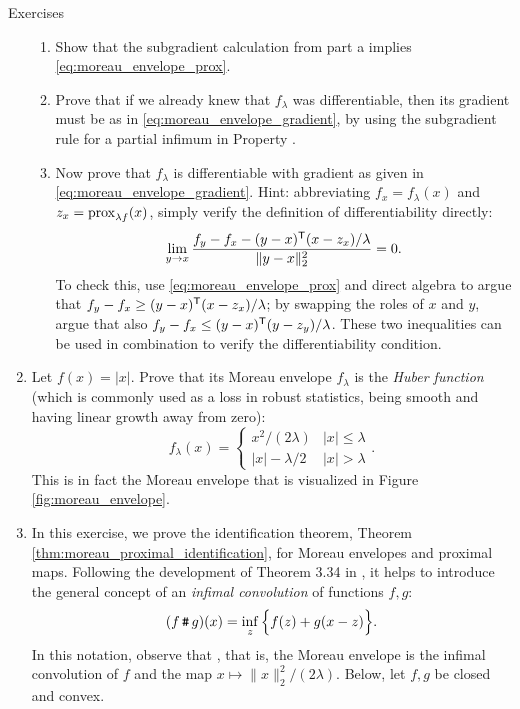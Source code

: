\begin{xcb}{Exercises}
\begin{enumerate}[label=\thechapter.\arabic*]
\begin{enumerate}[label=\alph*.]
\item Show that the subgradient calculation from part a implies
  \eqref{eq:moreau_envelope_prox}. 

\item Prove that if we already knew that $f_\lambda$ was differentiable, then
  its gradient must be as in \eqref{eq:moreau_envelope_gradient}, by using the
  subgradient rule for a partial infimum in Property
  .   

\item Now prove that $f_\lambda$ is differentiable with gradient as given in
  \eqref{eq:moreau_envelope_gradient}. Hint: abbreviating $f_x = f_\lambda(x)$
  and $z_x = \operatorname{prox}_{\lambda f}(x)$, simply verify the definition of
  differentiability directly: 
  \[
  \lim_{y \to x} \frac{f_y - f_x - (y - x)^{\mathsf{T}} (x - z_x) / \lambda}{\|y-x\|_2^2} 
  = 0.
  \]
  To check this, use \eqref{eq:moreau_envelope_prox} and direct algebra to argue 
  that $f_y - f_x \geq (y - x)^{\mathsf{T}} (x - z_x) / \lambda$; by swapping the roles of
  $x$ and $y$, argue that also $f_y - f_x \leq (y - x)^{\mathsf{T}} (y - z_y) / \lambda$. 
  These two inequalities can be used in combination to verify the
  differentiability condition.     
\end{enumerate}

\item Let $f(x) = |x|$. Prove that its Moreau envelope $f_\lambda$ is the 
  \emph{Huber function} (which is commonly used as a loss in robust statistics,
  being smooth and having linear growth away from zero): 
  \[
  f_\lambda(x) = 
  \begin{cases}
  x^2/ (2\lambda) & |x| \leq \lambda \\
  |x| - \lambda/2 & |x| > \lambda
  \end{cases}.
  \]
  This is in fact the Moreau envelope that is visualized in Figure
  \ref{fig:moreau_envelope}.  

\item \label{ex:moreau_proximal_identification}
  In this exercise, we prove the identification theorem, Theorem
  \ref{thm:moreau_proximal_identification}, for Moreau envelopes and proximal
  maps. Following the development of Theorem 3.34 in
  \cite{rockafellar2009variational}, it helps to introduce the general concept 
  of an \emph{infimal convolution} of functions $f,g$: 
  \[
  (f \operatorname{\texttt{\#}} g)(x) = \inf_z \Big\{ f(z) + g(x-z) \Big\}.
  \]
  In this notation, observe that , that is, the Moreau envelope is the infimal convolution of $f$
  and the map $x \mapsto \|x\|_2^2 /  (2\lambda)$. Below, let $f,g$ be closed
  and convex.   


\end{enumerate}
\end{xcb}
